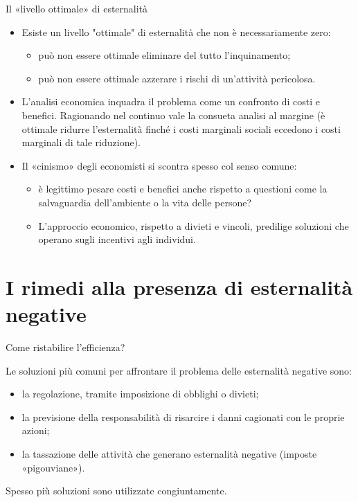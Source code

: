 \documentclass[aspectratio=64,11pt]{beamer}
\begin{document}
\begin{frame}{Il «livello ottimale» di esternalità}
\begin{itemize}
\item Esiste un livello "ottimale" di esternalità che non è necessariamente zero:
\begin{itemize}
\item può non essere ottimale eliminare del tutto l'inquinamento;
\item può non essere ottimale azzerare i rischi di un'attività pericolosa.
\end{itemize}
\item L’analisi economica inquadra il problema come un confronto di costi e
benefici. Ragionando nel continuo vale la consueta analisi al margine
(è ottimale ridurre l'esternalità finché i costi marginali sociali eccedono i costi
marginali di tale riduzione).
\item Il «cinismo» degli economisti si scontra spesso col senso comune:
\begin{itemize}
\item è legittimo pesare costi e benefici anche rispetto a questioni come la
salvaguardia dell'ambiente o la vita delle persone?
\item L’approccio economico, rispetto a divieti e vincoli, predilige soluzioni
che operano sugli incentivi agli individui.
\end{itemize}
\end{itemize}
\end{frame}

\section{I rimedi alla presenza di esternalità negative}


\begin{frame}{Come ristabilire l'efficienza?}
\fontsize{13}{16}\selectfont

Le soluzioni più comuni per affrontare il problema delle esternalità negative sono:
\begin{itemize}
\item la \alert{regolazione}, tramite imposizione di obblighi o divieti;
\item la previsione della \alert{responsabilità} di risarcire i danni cagionati con le proprie azioni;
\item la \alert{tassazione} delle attività che generano esternalità negative (imposte «pigouviane»).
\end{itemize}

Spesso più soluzioni sono utilizzate congiuntamente.
\end{frame}
\end{document}
